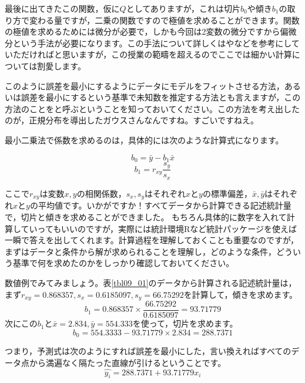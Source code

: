 \documentclass{ltjbook}
\begin{document}
最後に出てきたこの関数，仮に$Q$としてありますが，これは切片$b_0$や傾き$b_1$の取り方で変わる量ですが，二乗の関数ですので極値を求めることができます。関数の極値を求めるためには微分が必要で，しかも今回は2変数の微分ですから偏微分という手法が必要になります。この手法について詳しくは\citet{kosugi2018}や\citet{西内201712}などを参考にしていただければと思いますが，この授業の範疇を超えるのでここでは細かい計算については割愛します。

このように誤差を最小にするようにデータにモデルをフィットさせる方法，あるいは誤差を最小にするという基準で未知数を推定する方法とも言えますが，この方法のことをと呼ぶということを知っておいてください。この方法を考え出したのが，正規分布を導出したガウスさんなんですね。すごいですねえ。

最小二乗法で係数を求めるのは，具体的には次のような計算式になります。

\[ b_0 = \bar{y}-b_1\bar{x} \]
\[ b_1 = r_{xy}\frac{s_y}{s_x} \]

ここで$r_{xy}$は変数$x,y$の相関係数，$s_x,s_y$はそれぞれ$x$と$y$の標準偏差，$\bar{x},\bar{y}$はそれぞれ$x$と$y$の平均値です。いかがですか！すべてデータから計算できる記述統計量で，切片と傾きを求めることができました。
もちろん具体的に数字を入れて計算していってもいいのですが，実際には統計環境Rなど統計パッケージを使えば一瞬で答えを出してくれます。計算過程を理解しておくことも重要なのですが，まずはデータと条件から解が求められることを理解し，どのような条件，どういう基準で何を求めたのかをしっかり確認しておいてください。

数値例でみてみましょう。表\ref{tbl09_01}のデータから計算される記述統計量は，まず$r_{xy}=0.868357,s_x=0.6185097,s_y=66.75292$を計算して，傾きを求めます。
\[ b_1 = 0.868357 \times \frac{66.75292}{0.6185097} = 93.71779 \]
次にこの$b_1$と$\bar{x} = 2.834,\bar{y}=554.333$を使って，切片を求めます。
\[ b_0 = 554.3333 - 93.71779 \times 2.834 = 288.7371 \]

つまり，予測式は次のようにすれば誤差を最小にした，言い換えればすべてのデータ点から満遍なく隔たった直線が引けるということです。
\[ \hat{y_i} = 288.7371 + 93.71779 x_i \]
\end{document}
